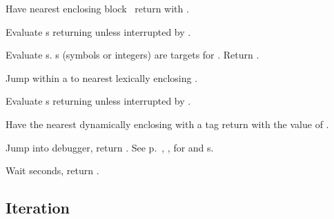 \begin{LIST}{1cm}
  {
  Have nearest enclosing block \NIL\ return with .
  }

  {Evaluate s returning
   unless interrupted by .
  }

  {
  Evaluate s. s (symbols or integers) are targets
  for . Return \retval{\NIL}. 
  }

  {Jump within a  to nearest
  lexically enclosing  .
  }

  {Evaluate s returning
   unless interrupted by .
  }

  {Have the nearest dynamically
  enclosing  with a tag   return with the
  value of .
  }

  {
  Jump into debugger, return \retval{\NIL}.
  See p.\ \pageref{section:Format}, , for 
  and s. 
  }

  {Wait  seconds, return \retval{\NIL}.
    }

\end{LIST}



\subsection{Iteration}


